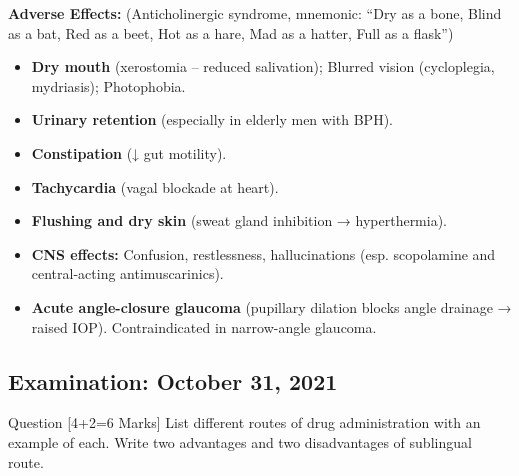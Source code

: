 \documentclass[11pt,a4paper]{article}
\begin{document}
\begin{ansbox}
\textbf{Adverse Effects:} (Anticholinergic syndrome, mnemonic: ``Dry as a bone, Blind as a bat, Red as a beet, Hot as a hare, Mad as a hatter, Full as a flask'')
\begin{itemize}[leftmargin=*]
    \item \textbf{Dry mouth} (xerostomia -- reduced salivation); Blurred vision (cycloplegia, mydriasis); Photophobia.
    \item \textbf{Urinary retention} (especially in elderly men with BPH).
    \item \textbf{Constipation} (↓ gut motility).
    \item \textbf{Tachycardia} (vagal blockade at heart).
    \item \textbf{Flushing and dry skin} (sweat gland inhibition → hyperthermia).
    \item \textbf{CNS effects:} Confusion, restlessness, hallucinations (esp. scopolamine and central-acting antimuscarinics).
    \item \textbf{Acute angle-closure glaucoma} (pupillary dilation blocks angle drainage → raised IOP). Contraindicated in narrow-angle glaucoma.
\end{itemize}
\end{ansbox}

\subsection{Examination: October 31, 2021}

\begin{qbox}{Question [4+2=6 Marks]}
List different routes of drug administration with an example of each. Write two advantages and two disadvantages of sublingual route.
\end{qbox}
\end{document}
